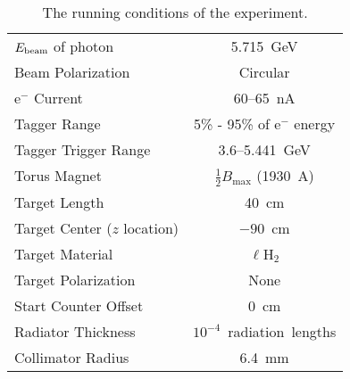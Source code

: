\begin{table}[htpb]
\begin{center}

\begin{minipage}{0.8\textwidth}

\caption{\label{tab:runconditions}The running conditions of the  experiment.}
\begin{center}
\begin{tabular}{lc}

\hline \hline

$E_{\mathrm{beam}}$ of photon & 5.715~GeV \\
Beam Polarization & Circular \\
e$^-$ Current & 60--65~nA \\
Tagger Range & 5\% - 95\% of e$^-$ energy \\
Tagger Trigger Range & 3.6--5.441~GeV \\
Torus Magnet & $\frac{1}{2} B_\mathrm{max}$ (1930~A) \\
Target Length & 40~cm \\
Target Center ($z$ location) & $-90$~cm \\
Target Material & $\ell$H$_2$ \\
Target Polarization & None \\
Start Counter Offset & 0~cm \\
Radiator Thickness & $10^{-4}$~radiation~lengths \\
Collimator Radius & 6.4~mm \\

\hline \hline

\end{tabular}
\end{center}

\end{minipage}

\end{center}
\end{table}

